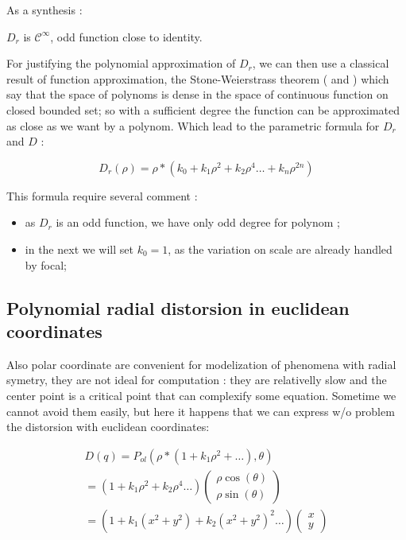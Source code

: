 As a synthesis :

\begin{proposal} \;
\label{DrHyp}
       $D_r$ is $\mathcal{C}^{\infty}$, odd function close to identity.
\end{proposal}

For justifying the polynomial approximation of $D_r$, we can then use a classical result of function 
approximation, the Stone-Weierstrass theorem (\cite{Weierstrass1885} and \cite{Stone1937})
which say that the space of polynoms is dense in the space of continuous function on closed bounded set;
so with a sufficient degree the function can be approximated as close as we want by a polynom.
Which lead to the parametric formula for $D_r$ and $D$ :

\begin{equation}
	D_r(\rho)  =   \rho  * (k_0 + k_1 \rho^ 2 + k_2 \rho^4 \dots  + k_n \rho^{2n})
\end{equation}

This formula require several comment :

\begin{itemize}
    \item  as $D_r$ is an odd function, we have only odd degree for polynom ; 

    \item  in the next we will set $k_0=1$, as the variation on scale are already handled by focal;
\end{itemize}


\subsection{Polynomial radial distorsion in euclidean coordinates}

Also polar coordinate are convenient for modelization of phenomena with radial symetry, 
they are not ideal for computation : they are relativelly slow and  the center point is
a critical point that can complexify some equation.  Sometime we cannot avoid them
easily, but here it happens that we can express w/o problem the distorsion
with euclidean coordinates:

\begin{equation}
\begin{multlined}
D(q)  =   P_{ol}(\rho  * (1 + k_1 \rho^ 2 + \dots) ,\theta)  \\
=   (1 + k_1 \rho^ 2 +  k_2 \rho^ 4 \dots)  \begin{pmatrix} \rho\cos(\theta) \\ \rho \sin(\theta) \end{pmatrix} \\
=   (1 + k_1 (x^2+y^2) +  k_2 (x^2+y^2) ^2 \dots)  \begin{pmatrix} x \\ y \end{pmatrix}
\end{multlined}
\end{equation}



